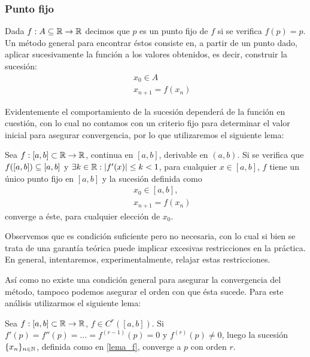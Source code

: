 \subsubsection{Punto fijo}
Dada $f: A\subseteq\mathbb{R} \rightarrow \mathbb{R}$ decimos que $p$ es un punto fijo de $f$ si se verifica $f(p) = p$.  Un método general para encontrar éstos consiste en, a partir de un punto dado, aplicar sucesivamente la función a los valores obtenidos, es decir, construir la sucesión:
	\begin{eqnarray}
		&& x_0 \in A\nonumber \\
		&& x_{n+1} = f(x_n) \nonumber
	\end{eqnarray}

Evidentemente el comportamiento de la sucesión dependerá de la función en cuestión, con lo cual no contamos con un criterio fijo para determinar el valor inicial para asegurar convergencia, por lo que utilizaremos el siguiente lema:
\begin{lema}
Sea $f: [a,b] \subset \mathbb{R} \rightarrow \mathbb{R}$, continua en $[a,b]$, derivable en $(a,b)$. Si se verifica que $f([a,b]) \subseteq [a,b]$ y $\exists k \in\mathbb{R} : |f'(x)| \leq k < 1$, para cualquier $x\in [a,b]$, $f$ tiene un único punto fijo en $[a,b]$ y la sucesión definida como 
	\begin{eqnarray}
		&& x_0 \in [a,b], \nonumber \\
		&& x_{n+1} = f(x_n) \nonumber
	\end{eqnarray}
	converge a éste, para cualquier elección de $x_0$.
\label{lema_f}
\end{lema}
Observemos que es condición suficiente pero no necesaria, con lo cual si bien se trata de una garantía teórica puede implicar excesivas restricciones en la práctica. En general, intentaremos, experimentalmente, relajar estas restricciones.

Así como no existe una condición general para asegurar la convergencia del método, tampoco podemos asegurar el orden con que ésta sucede. Para este análisis utilizarmos el siguiente lema:
\begin{lema}
Sea $f: [a,b] \subset \mathbb{R} \rightarrow \mathbb{R}$, $f \in C^{r}([a,b])$. Si $f'(p) = f''(p) = \dots = f^{(r-1)}(p) = 0$ y $f^{(r)}(p) \neq 0$, luego la sucesión $\{x_n\}_{n\in\mathbb{N}}$, definida como en \ref{lema_f}, converge a $p$ con orden $r$.
\label{lema_conv}
\end{lema}

